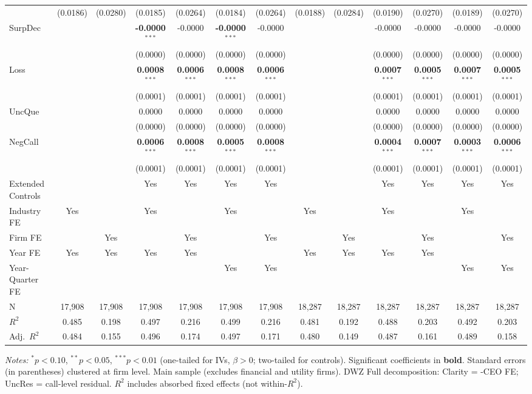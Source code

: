 \documentclass[11pt,a4paper]{article}
\begin{document}
\begin{table}[htbp]
\begin{tabular}{lcccccccccccc}
 & (0.0186) & (0.0280) & (0.0185) & (0.0264) & (0.0184) & (0.0264) & (0.0188) & (0.0284) & (0.0190) & (0.0270) & (0.0189) & (0.0270) \\
SurpDec &  &  & \textbf{-0.0000}$^{***}$ & -0.0000 & \textbf{-0.0000}$^{***}$ & -0.0000 &  &  & -0.0000 & -0.0000 & -0.0000 & -0.0000 \\
 &  &  & (0.0000) & (0.0000) & (0.0000) & (0.0000) &  &  & (0.0000) & (0.0000) & (0.0000) & (0.0000) \\
Loss &  &  & \textbf{0.0008}$^{***}$ & \textbf{0.0006}$^{***}$ & \textbf{0.0008}$^{***}$ & \textbf{0.0006}$^{***}$ &  &  & \textbf{0.0007}$^{***}$ & \textbf{0.0005}$^{***}$ & \textbf{0.0007}$^{***}$ & \textbf{0.0005}$^{***}$ \\
 &  &  & (0.0001) & (0.0001) & (0.0001) & (0.0001) &  &  & (0.0001) & (0.0001) & (0.0001) & (0.0001) \\
UncQue &  &  & 0.0000 & 0.0000 & 0.0000 & 0.0000 &  &  & 0.0000 & 0.0000 & 0.0000 & 0.0000 \\
 &  &  & (0.0000) & (0.0000) & (0.0000) & (0.0000) &  &  & (0.0000) & (0.0000) & (0.0000) & (0.0000) \\
NegCall &  &  & \textbf{0.0006}$^{***}$ & \textbf{0.0008}$^{***}$ & \textbf{0.0005}$^{***}$ & \textbf{0.0008}$^{***}$ &  &  & \textbf{0.0004}$^{***}$ & \textbf{0.0007}$^{***}$ & \textbf{0.0003}$^{***}$ & \textbf{0.0006}$^{***}$ \\
 &  &  & (0.0001) & (0.0001) & (0.0001) & (0.0001) &  &  & (0.0001) & (0.0001) & (0.0001) & (0.0001) \\
\midrule
Extended Controls &  &  & Yes & Yes & Yes & Yes &  &  & Yes & Yes & Yes & Yes \\
Industry FE & Yes &  & Yes &  & Yes &  & Yes &  & Yes &  & Yes &  \\
Firm FE &  & Yes &  & Yes &  & Yes &  & Yes &  & Yes &  & Yes \\
Year FE & Yes & Yes & Yes & Yes &  &  & Yes & Yes & Yes & Yes &  &  \\
Year-Quarter FE &  &  &  &  & Yes & Yes &  &  &  &  & Yes & Yes \\
\midrule
N & 17,908 & 17,908 & 17,908 & 17,908 & 17,908 & 17,908 & 18,287 & 18,287 & 18,287 & 18,287 & 18,287 & 18,287 \\
$R^2$ & 0.485 & 0.198 & 0.497 & 0.216 & 0.499 & 0.216 & 0.481 & 0.192 & 0.488 & 0.203 & 0.492 & 0.203 \\
Adj.~$R^2$ & 0.484 & 0.155 & 0.496 & 0.174 & 0.497 & 0.171 & 0.480 & 0.149 & 0.487 & 0.161 & 0.489 & 0.158 \\
\bottomrule
\end{tabular}
\begin{minipage}{\linewidth}
\vspace{2pt}\scriptsize
\textit{Notes:} $^{*}p<0.10$, $^{**}p<0.05$, $^{***}p<0.01$ (one-tailed for IVs, $\beta > 0$; two-tailed for controls).
 Significant coefficients in \textbf{bold}.
 Standard errors (in parentheses) clustered at firm level.
 Main sample (excludes financial and utility firms). DWZ Full decomposition: Clarity = -CEO FE; UncRes = call-level residual.
 $R^2$ includes absorbed fixed effects (not within-$R^2$).
\end{minipage}
\end{table}
\end{document}
